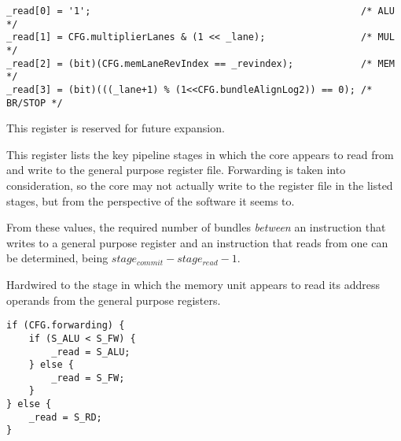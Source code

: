 \declaration{}
\implementation{}
\begin{lstlisting}
_read[0] = '1';                                                /* ALU */
_read[1] = CFG.multiplierLanes & (1 << _lane);                 /* MUL */
_read[2] = (bit)(CFG.memLaneRevIndex == _revindex);            /* MEM */
_read[3] = (bit)(((_lane+1) % (1<<CFG.bundleAlignLog2)) == 0); /* BR/STOP */
\end{lstlisting}


This register is reserved for future expansion.


This register lists the key pipeline stages in which the core appears to read
from and write to the general purpose register file. Forwarding is taken into
consideration, so the core may not actually write to the register file in the
listed stages, but from the perspective of the software it seems to.

From these values, the required number of bundles \emph{between} an instruction
that writes to a general purpose register and an instruction that reads from one
can be determined, being $stage_{commit} - stage_{read} - 1$.

Hardwired to the stage in which the memory unit appears to read its address
operands from the general purpose registers.

\reset{****}
\implementation{}
\begin{lstlisting}
if (CFG.forwarding) {
    if (S_ALU < S_FW) {
        _read = S_ALU;
    } else {
        _read = S_FW;
    }
} else {
    _read = S_RD;
}
\end{lstlisting}

